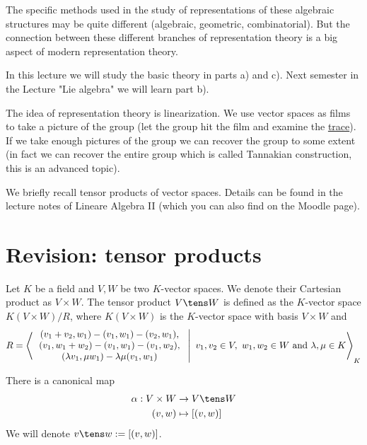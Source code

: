 \documentclass[twoside = false,	%
		headsepline,		%
		parskip = true,
		]{scrbook}						%
\begin{document}
    The specific methods used in the study of representations of these algebraic structures may be quite different (algebraic, geometric, combinatorial). But the connection between these different branches of representation theory is a big aspect of modern representation theory.
    
    In this lecture we will study the basic theory in parts a) and c). Next semester in the Lecture "Lie algebra" we will learn part b).
    
    The idea of representation theory is linearization. We use vector spaces as films to take a picture of the group (let the group hit the film and examine the \underline{trace}). If we take enough pictures of the group we can recover the group to some extent (in fact we can recover the entire group which is called Tannakian construction, this is an advanced topic).
    
    We briefly recall tensor products of vector spaces. Details can be found in the lecture notes of Lineare Algebra II \cite{LA} (which you can also find on the Moodle page).
    
    \setcounter{section}{-1}
    
\section{Revision: tensor products}
    
    Let $K$ be a field and $V, W$ be two $K$-vector spaces. We denote their Cartesian product as $V \times W$. The tensor product $V \tens W$ is defined as the $K$-vector space $K(V \times W)/R$, where $K(V \times W)$ is the $K$-vector space with basis $V \times W$ and
    \begin{equation*}
        \begin{split}
            R = \left\langle  \left. \begin{array}{c}
                (v_1+v_2,w_1) - (v_1,w_1) - (v_2,w_1), \\ (v_1,w_1 + w_2) - (v_1,w_1) - (v_1,w_2),  \\
                (\lambda v_1, \mu w_1) - \lambda \mu (v_1,w_1) 
            \end{array}  \ \right| \ v_1,v_2 \in V, \ w_1,w_2 \in W \text{ and } \lambda,\mu \in K \right\rangle_K        
        \end{split}
    \end{equation*}
    
    There is a canonical map
    \begin{equation*}
    \begin{split}
        \alpha: V \times W &\to V \tens W \\ (v,w) &\mapsto [(v,w)]        
    \end{split}
    \end{equation*}
    We will denote $v \tens w := [(v,w)]$.
    
\end{document}
